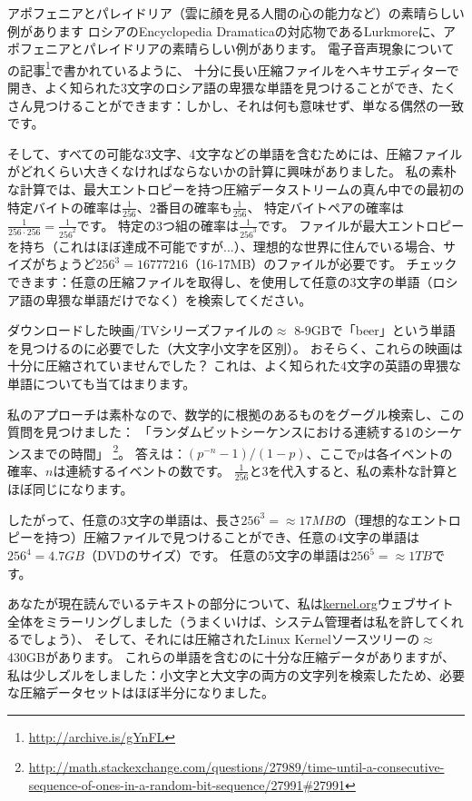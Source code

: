 アポフェニアとパレイドリア（雲に顔を見る人間の心の能力など）の素晴らしい例があります
ロシアのEncyclopedia Dramaticaの対応物であるLurkmoreに、アポフェニアとパレイドリアの素晴らしい例があります。
電子音声現象についての記事\footnote{\url{http://archive.is/gYnFL}}で書かれているように、
十分に長い圧縮ファイルをヘキサエディターで開き、よく知られた3文字のロシア語の卑猥な単語を見つけることができ、たくさん見つけることができます：しかし、それは何も意味せず、単なる偶然の一致です。

そして、すべての可能な3文字、4文字などの単語を含むためには、圧縮ファイルがどれくらい大きくなければならないかの計算に興味がありました。
私の素朴な計算では、最大エントロピーを持つ圧縮データストリームの真ん中での最初の特定バイトの確率は$\frac{1}{256}$、2番目の確率も$\frac{1}{256}$、
特定バイトペアの確率は$\frac{1}{256 \cdot 256} = \frac{1}{256^2}$です。
特定の3つ組の確率は$\frac{1}{256^3}$です。
ファイルが最大エントロピーを持ち（これはほぼ達成不可能ですが...）、理想的な世界に住んでいる場合、サイズがちょうど$256^3=16777216$（16-17MB）のファイルが必要です。
チェックできます：任意の圧縮ファイルを取得し、を使用して任意の3文字の単語（ロシア語の卑猥な単語だけでなく）を検索してください。

ダウンロードした映画/TVシリーズファイルの$\approx$ 8-9GBで「beer」という単語を見つけるのに必要でした（大文字小文字を区別）。
おそらく、これらの映画は十分に圧縮されていませんでした？
これは、よく知られた4文字の英語の卑猥な単語についても当てはまります。

私のアプローチは素朴なので、数学的に根拠のあるものをグーグル検索し、この質問を見つけました：
「ランダムビットシーケンスにおける連続する1のシーケンスまでの時間」
\footnote{\url{http://math.stackexchange.com/questions/27989/time-until-a-consecutive-sequence-of-ones-in-a-random-bit-sequence/27991#27991}}。
答えは：$(p^{−n}−1)/(1−p)$、ここで$p$は各イベントの確率、$n$は連続するイベントの数です。
$\frac{1}{256}$と$3$を代入すると、私の素朴な計算とほぼ同じになります。

したがって、任意の3文字の単語は、長さ$256^3 = \approx 17MB$の（理想的なエントロピーを持つ）圧縮ファイルで見つけることができ、任意の4文字の単語は$256^4 = 4.7GB$（DVDのサイズ）です。
任意の5文字の単語は$256^5 = \approx 1TB$です。

あなたが現在読んでいるテキストの部分について、私は\href{https://www.kernel.org/}{kernel.org}ウェブサイト全体をミラーリングしました（うまくいけば、システム管理者は私を許してくれるでしょう）、
そして、それには圧縮されたLinux Kernelソースツリーの$\approx$ 430GBがあります。
これらの単語を含むのに十分な圧縮データがありますが、私は少しズルをしました：小文字と大文字の両方の文字列を検索したため、必要な圧縮データセットはほぼ半分になりました。

